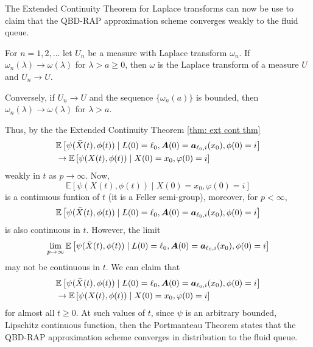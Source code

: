 The Extended Continuity Theorem for Laplace transforms \cite[Chapter XIII, Theorem 2a]{feller1957} can now be use to claim that the QBD-RAP approximation scheme converges weakly to the fluid queue.
\begin{thm}\label{thm: ext cont thm}
	For \(n=1,2,\dots\) let \(U_n\) be a measure with Laplace transform \(\omega_n\). If \(\omega_n(\lambda)\to\omega(\lambda)\) for \(\lambda > a\geq 0\), then \(\omega\) is the Laplace transform of a measure \(U\) and \(U_n\to U\).
	
	Conversely, if \(U_n\to U\) and the sequence \(\{\omega_n(a)\}\) is bounded, then \(\omega_n(\lambda)\to\omega(\lambda)\) for \(\lambda >a\). 
\end{thm}
Thus, by the the Extended Continuity Theorem \ref{thm: ext cont thm}
\begin{align}
		&\mathbb E\left[\psi(\bar X(t),\phi(t))  \mid L(0)=\ell_0, \boldsymbol A(0)=\boldsymbol  a_{\ell_0,i}(x_0), \phi(0)=i \right] \nonumber
		\\&\to \mathbb E\left[\psi(X(t),\phi(t))\mid X(0)=x_0, \varphi(0)=i \right] \nonumber
\end{align}
weakly in \(t\) as \(p\to \infty\). Now, \[\mathbb E\left[\psi(X(t),\phi(t))\mid X(0)=x_0, \varphi(0)=i \right]\] is a continuous funtion of \(t\) (it is a Feller semi-group), moreover, for \(p<\infty\), \[\mathbb E\left[\psi(\bar X(t),\phi(t))  \mid L(0)=\ell_0, \boldsymbol A(0)=\boldsymbol  a_{\ell_0,i}(x_0), \phi(0)=i \right] \] is also continuous in \(t\). However, the limit \[\lim\limits_{p\to\infty}\mathbb E\left[\psi(\bar X(t),\phi(t))  \mid L(0)=\ell_0, \boldsymbol A(0)=\boldsymbol  a_{\ell_0,i}(x_0), \phi(0)=i \right] \] may not be continuous in \(t\). We can claim that 
\begin{align}
		&\mathbb E\left[\psi(\bar X(t),\phi(t))  \mid L(0)=\ell_0, \boldsymbol A(0)=\boldsymbol  a_{\ell_0,i}(x_0), \phi(0)=i \right] \nonumber
		\\&\to \mathbb E\left[\psi(X(t),\phi(t))\mid X(0)=x_0, \varphi(0)=i \right] \nonumber
\end{align}
for almost all \(t\geq 0\). At such values of \(t\), since \(\psi\) is an arbitrary bounded, Lipschitz continuous function, then the Portmanteau Theorem states that the QBD-RAP approximation scheme converges in distribution to the fluid queue.

